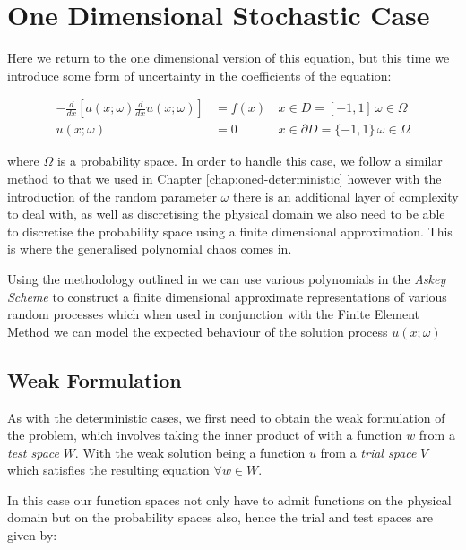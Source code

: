 \chapter{One Dimensional Stochastic Case}\label{chap:oned-stochastic}

Here we return to the one dimensional version of this equation, but this time
we introduce some form of uncertainty in the coefficients of the equation:

\begin{equation}\label{eq:oned-stochastic}
  \begin{aligned}
      -\frac{d}{dx}\left[a(x;\omega)\frac{d}{dx}u(x;\omega)\right] &= f(x)\,
                              &x \in  D = [-1,1]\, \omega \in \Omega \\
    u(x;\omega) &= 0 &x \in \partial D = \{-1,1\}\, \omega \in \Omega
  \end{aligned}
\end{equation}

where $\Omega$ is a probability space. In order to handle this case, we follow
a similar method to that we used in Chapter \ref{chap:oned-deterministic}
however with the introduction of the random parameter $\omega$ there is an
additional layer of complexity to deal with, as well as discretising the
physical domain we also need to be able to discretise the probability space
using a finite dimensional approximation.  This is where the generalised
polynomial chaos comes in.

Using the methodology outlined in \cite{general-poly-chaos} we can use various
polynomials in the \textit{Askey Scheme} to construct a finite dimensional
approximate representations of various random processes which when used in
conjunction with the Finite Element Method we can model the expected behaviour
of the solution process $u(x;\omega)$

\section{Weak Formulation}

As with the deterministic cases, we first need to obtain the weak formulation
of the problem, which involves taking the inner product of
 with a function $w$ from a \textit{test space} $W$.
With the weak solution being a function $u$ from a \textit{trial space} $V$
which satisfies the resulting equation $\forall w \in W$.

In this case our function spaces not only have to admit functions on the
physical domain but on the probability spaces also, hence the trial and test
spaces are given by:

